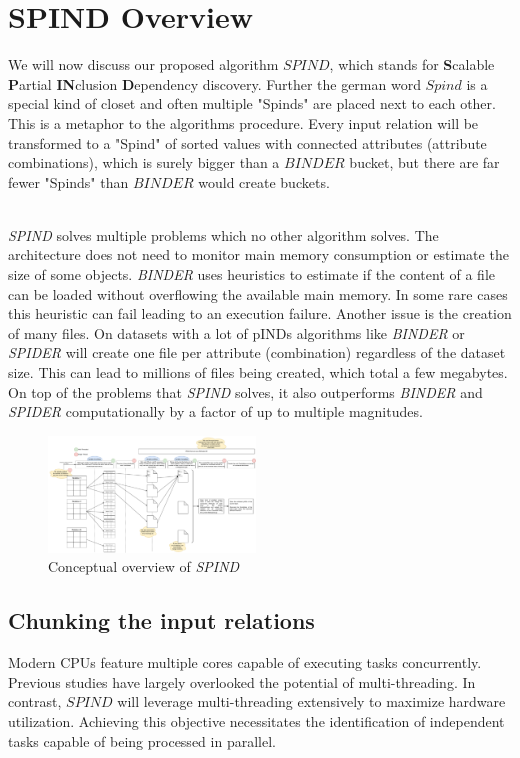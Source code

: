 \section{SPIND Overview}

We will now discuss our proposed algorithm $SPIND$, which stands for \textbf{S}calable \textbf{P}artial \textbf{IN}clusion \textbf{D}ependency discovery. Further the german word $Spind$ is a special kind of closet and often multiple "Spinds" are placed next to each other. This is a metaphor to the algorithms procedure. Every input relation will be transformed to a "Spind" of sorted values with connected attributes (attribute combinations), which is surely bigger than a $BINDER$ bucket, but there are far fewer "Spinds" than $BINDER$ would create buckets.

\noindent \\ \textit{SPIND} solves multiple problems which no other algorithm solves. The architecture does not need to monitor main memory consumption or estimate the size of some objects. \textit{BINDER} uses heuristics to estimate if the content of a file can be loaded without overflowing the available main memory. In some rare cases this heuristic can fail leading to an execution failure. Another issue is the creation of many files. On datasets with a lot of pINDs algorithms like \textit{BINDER} or \textit{SPIDER} will create one file per attribute (combination) regardless of the dataset size. This can lead to millions of files being created, which total a few megabytes. On top of the problems that \textit{SPIND} solves, it also outperforms \textit{BINDER} and \textit{SPIDER} computationally by a factor of up to multiple magnitudes.

\begin{figure}[h]
    \centering
    \includegraphics[width=0.49\textwidth]{figures/SPIND.pdf}
    \caption{Conceptual overview of \textit{SPIND}}
    \label{fig:spind}
\end{figure}

\subsection{Chunking the input relations}
Modern CPUs feature multiple cores capable of executing tasks concurrently. Previous studies have largely overlooked the potential of multi-threading. In contrast, $SPIND$ will leverage multi-threading extensively to maximize hardware utilization. Achieving this objective necessitates the identification of independent tasks capable of being processed in parallel.

